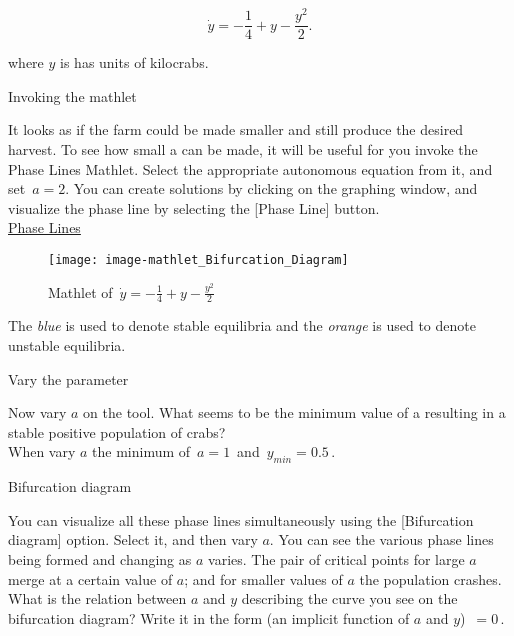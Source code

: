 \begin{equation*}
  \dot y = -\frac{1}{4} + y - \frac{y^2}{2}.
\end{equation*}

where $y$ is has units of kilocrabs.

\begin{problem}
  Invoking the mathlet
\end{problem}

It looks as if the farm could be made smaller and still produce the desired harvest.
To see how small a can be made, it will be useful for you invoke the Phase Lines Mathlet.
Select the appropriate autonomous equation from it, and set $\, a=2$.
You can create solutions by clicking on the graphing window,
and visualize the phase line by selecting the [Phase Line] button.\\

\href{http://mathlets.org/mathlets/phase-lines/}
{Phase Lines}

\begin{figure}[ht!]
  \centering
  \texttt{[image: image-mathlet\_Bifurcation\_Diagram]}
  \caption{Mathlet of $\, \dot y = -\frac{1}{4} + y - \frac{y^2}{2} \,$}
\end{figure}

The \emph{\color{blue} blue} is used to denote stable equilibria and
the \emph{\color{orange} orange} is used to denote unstable equilibria.

\begin{problem}
  Vary the parameter
\end{problem}

Now vary $a$ on the tool.
What seems to be the minimum value of a resulting in a stable positive population of crabs? \\

When vary $a$ the minimum of $\, a  = 1\,$ and $\, y_{min} = 0.5 \,$.

\begin{problem}
  Bifurcation diagram
\end{problem}

You can visualize all these phase lines simultaneously using the [Bifurcation diagram] option.
Select it, and then vary $a$.
You can see the various phase lines being formed and changing as $a$ varies.
The pair of critical points for large $a$ merge at a certain value of $a$;
and for smaller values of $a$ the population crashes. \\

What is the relation between $a$ and $y$ describing
the curve you see on the bifurcation diagram?
Write it in the form (an implicit function of $a$ and $y$) $\,=0 \,$. \\

